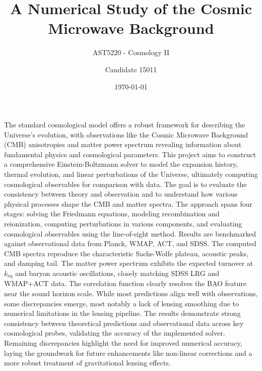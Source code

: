 \documentclass{aa}
\numberwithin{equation}{section}
\numberwithin{table}{section}
\numberwithin{figure}{section}
\begin{document}
 


   \title{A Numerical Study of the Cosmic Microwave Background}

   \subtitle{AST5220 - Cosmology II}

   \author{Candidate 15011
          }


   \date{\today}

 
  \abstract

{The standard cosmological model offers a robust framework for describing the Universe's evolution, with observations like the Cosmic Microwave Background (CMB) anisotropies and matter power spectrum revealing information about fundamental physics and cosmological parameters.}
{This project aims to construct a comprehensive Einstein-Boltzmann solver to model the expansion history, thermal evolution, and linear perturbations of the Universe, ultimately computing cosmological observables for comparison with data. The goal is to evaluate the consistency between theory and observation and to understand how various physical processes shape the CMB and matter spectra.}
{The approach spans four stages: solving the Friedmann equations, modeling recombination and reionization, computing perturbations in various components, and evaluating cosmological observables using the line-of-sight method. Results are benchmarked against observational data from Planck, WMAP, ACT, and SDSS.}
{The computed CMB spectra reproduce the characteristic Sachs-Wolfe plateau, acoustic peaks, and damping tail. The matter power spectrum exhibits the expected turnover at $k_\text{eq}$ and baryon acoustic oscillations, closely matching SDSS LRG and WMAP+ACT data. The correlation function clearly resolves the BAO feature near the sound horizon scale. While most predictions align well with observations, some discrepancies emerge, most notably a lack of lensing smoothing due to numerical limitations in the lensing pipeline.}
{The results demonstrate strong consistency between theoretical predictions and observational data across key cosmological probes, validating the accuracy of the implemented solver. Remaining discrepancies highlight the need for improved numerical accuracy, laying the groundwork for future enhancements like non-linear corrections and a more robust treatment of gravitational lensing effects.}
\end{document}
